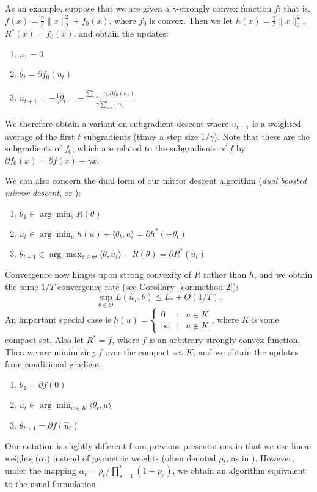 \documentclass{article} %
\begin{document}
As an example, suppose that we are given a $\gamma$-strongly convex function 
$f$: that is, $f(x) = \frac{\gamma}{2}\|x\|_2^2 + f_0(x)$, where $f_0$ is convex. 
Then we let $h(x) = \frac{\gamma}{2}\|x\|_2^2$, $R^*(x) = f_0(x)$, and obtain 
the updates:
\begin{enumerate}
\item $u_1 = 0$
\item $\theta_t = \partial f_0(u_t)$
\item $u_{t+1} = -\frac{1}{\gamma}\hat{\theta}_t = -\frac{\sum_{s=1}^t \alpha_s\partial f_0(u_s)}{\gamma \sum_{s=1}^t \alpha_s}$
\end{enumerate}
We therefore obtain a variant on subgradient descent where $u_{t+1}$ 
is a weighted average of the first $t$ subgradients (times a step size 
$1/\gamma$). Note that these are the subgradients of $f_0$, which are related 
to the subgradients of $f$ by $\partial f_0(x) = \partial f(x) - \gamma x$.

We can also concern the dual form of our mirror descent algorithm 
({\em dual boosted mirror descent}, or \dual):
\begin{enumerate}
\item $\theta_1 \in \arg\min_{\theta} R(\theta)$
\item $u_t \in \arg\min_{u} h(u) + \langle \theta_t, u \rangle = \partial h^{*}(-\theta_{t})$
\item $\theta_{t+1} \in \arg\max_{\theta \in \Theta} \langle \theta, \hat{u}_t \rangle - R(\theta) = \partial R^{*}(\hat u_{t})$
\end{enumerate}
Convergence now hinges upon strong convexity of $R$ rather than 
$h$, and we obtain the same $1/T$ convergence 
rate (see Corollary~\ref{cor:method-2}):
\[ \sup_{\theta \in \Theta} L(\hat{u}_T, \theta) \leq L_{*} + O(1/T). \]
An important special case is $h(u) = \left\{ \begin{array}{ccl} 0 & : & u \in K \\ \infty & : & u \not\in K \end{array} \right.$, where $K$ is some 
compact set. Also let $R^* = f$, where $f$ is an arbitrary strongly convex 
function. Then we are minimizing $f$ over the compact set $K$, and we obtain 
the updates from conditional gradient:
\begin{enumerate}
\item $\theta_1 = \partial f(0)$
\item $u_t \in \arg\min_{u \in K} \langle \theta_t, u \rangle$
\item $\theta_{t+1} = \partial f(\hat{u}_t)$
\end{enumerate}
Our notation is slightly different from previous presentations in 
that we use linear weights ($\alpha_t$) instead of geometric weights 
(often denoted $\rho_t$, as in \cite{Bach:2012b}). However, under the 
mapping $\alpha_t = \rho_t/\prod_{s=1}^t (1-\rho_s)$, we obtain an 
algorithm equivalent to the usual formulation.
\end{document}
